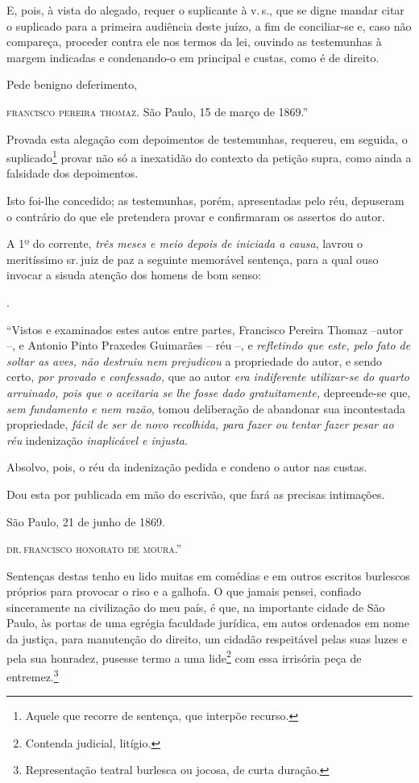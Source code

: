 E, pois, à vista do alegado, requer o suplicante à v.\,s., que se digne
mandar citar o suplicado para a primeira audiência deste juízo, a fim de
conciliar-se e, caso não compareça, proceder contra ele nos termos da
lei, ouvindo as testemunhas à margem indicadas e condenando-o em
principal e custas, como é de direito.

Pede benigno deferimento,
\begin{flushright}
\textsc{francisco pereira thomaz}.
São Paulo, 15 de março de 1869.''
\end{flushright}
Provada esta alegação com depoimentos de testemunhas, requereu, em
seguida, o suplicado\footnote{Aquele que recorre de sentença, que
  interpõe recurso.} provar não só a inexatidão do contexto da petição
supra, como ainda a falsidade dos depoimentos.

Isto foi-lhe concedido; as testemunhas, porém, apresentadas pelo réu,
depuseram o contrário do que ele pretendera provar e confirmaram os
assertos do autor.

A 1º do corrente, \emph{três meses e meio depois de iniciada a causa},
lavrou o meritíssimo sr.\,juiz de paz a seguinte memorável sentença, para
a qual ouso invocar a sisuda atenção dos homens de bom senso:

.

``Vistos e examinados estes autos entre partes, Francisco Pereira Thomaz
--autor --, e Antonio Pinto Praxedes Guimarães -- réu --, e
\emph{refletindo que este, pelo fato de soltar as aves, não destruiu nem
prejudicou} a propriedade do autor, e sendo certo, \emph{por provado e
confessado,} que ao autor \emph{era indiferente utilizar-se do quarto
arruinado, pois que o aceitaria se lhe fosse dado gratuitamente,}
depreende-se que, \emph{sem fundamento e nem razão}, tomou deliberação
de abandonar sua incontestada propriedade, \emph{fácil de ser de novo
recolhida, para fazer ou tentar fazer pesar ao réu} indenização
\emph{inaplicável e injusta}.

Absolvo, pois, o réu da indenização pedida e condeno o autor nas custas.

Dou esta por publicada em mão do escrivão, que fará as precisas
intimações.
\begin{flushright}
São Paulo, 21 de junho de 1869.

\textsc{dr.\,francisco honorato de moura}.''
\end{flushright}
Sentenças destas tenho eu lido muitas em comédias e em outros escritos
burlescos próprios para provocar o riso e a galhofa. O que jamais
pensei, confiado sinceramente na civilização do meu país, é que, na
importante cidade de São Paulo, às portas de uma egrégia faculdade
jurídica, em autos ordenados em nome da justiça, para manutenção do
direito, um cidadão respeitável pelas suas luzes e pela sua honradez,
pusesse termo a uma lide\footnote{Contenda judicial, litígio.} com
essa irrisória peça de entremez.\footnote{Representação teatral
  burlesca ou jocosa, de curta duração.}

